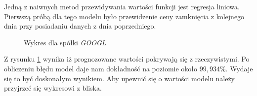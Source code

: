 \documentclass[a4paper, twoside, 11pt, openright]{article}
\begin{document}
Jedną z naiwnych metod przewidywania wartości funkcji jest regresja liniowa. Pierwszą próbą dla tego modelu było przewidzenie ceny zamknięcia z kolejnego dnia przy posiadaniu danych z dnia poprzedniego.

\begin{figure}[H]%
\centering
{}%
\qquad
{}%
\caption{Wykres dla spółki \textit{GOOGL}}
\label{linear_regression_1}
\end{figure}

Z rysunku \ref{linear_regression_1} wynika iż prognozowane wartości pokrywają się z rzeczywistymi. Po obliczeniu błędu model daje nam dokładność na poziomie około  $99,934\%$. Wydaje się to być doskonałym wynikiem. Aby upewnić się o wartości modelu należy przyjrzeć się wykresowi z bliska.
\end{document}
